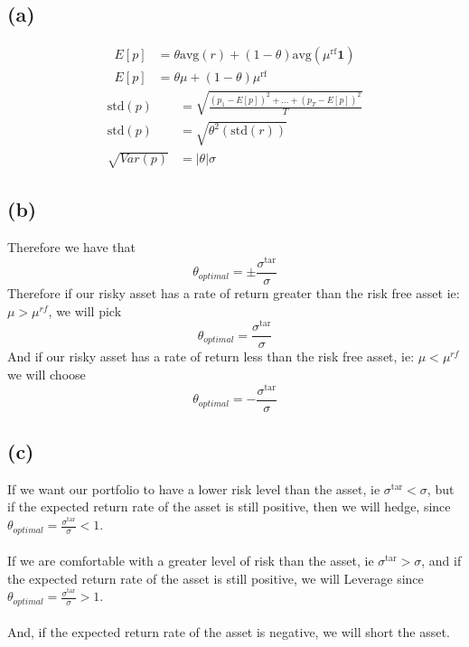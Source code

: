 \subsection*{(a)}
\begin{align*}
	E[p]&=\theta\text{avg}(r)+(1-\theta)\text{avg}(\mu^{\text{rf}}\textbf{1})\\
	E[p]&=\boxed{\theta\mu+(1-\theta)\mu^{\text{rf}}}
\end{align*}
\begin{align*}
	\text{std}(p)&=\sqrt{\frac{(p_1-E[p])^2+...+(p_T-E[p])^2}{T}}\\
	\text{std}(p)&=\sqrt{\theta^2(\text{std}(r))}\\
	\sqrt{Var(p)}&=\boxed{|\theta|\sigma}
\end{align*}
\subsection*{(b)}
Therefore we have that 
$$\theta_{optimal}=\pm \frac{\sigma^{\text{tar}}}{\sigma}$$
Therefore if our risky asset has a rate of return greater than the risk free asset
ie: $\mu>\mu^{rf}$, we will pick
$$\theta_{optimal}=\boxed{\frac{\sigma^{\text{tar}}}{\sigma}}$$
And if our risky asset has a rate of return less than the risk free asset, 
ie: $\mu<\mu^{rf}$ we will choose
$$\theta_{optimal}=\boxed{-\frac{\sigma^{\text{tar}}}{\sigma}}$$
\subsection*{(c)}
If we want our portfolio to have a lower risk level than the asset, ie $\sigma^{\text{tar}}<\sigma$,
but if the expected return rate of the asset is still positive, then we will hedge,
since $\theta_{optimal}=\frac{\sigma^{\text{tar}}}{\sigma}<1$.\\\\
If we are comfortable with a greater level of risk than the asset, ie $\sigma^{\text{tar}}>\sigma$, and
if the expected return rate of the asset is still positive, we will Leverage
since $\theta_{optimal}=\frac{\sigma^{\text{tar}}}{\sigma}>1$.\\\\
And, if the expected return rate of the asset is negative, we will short the asset.
